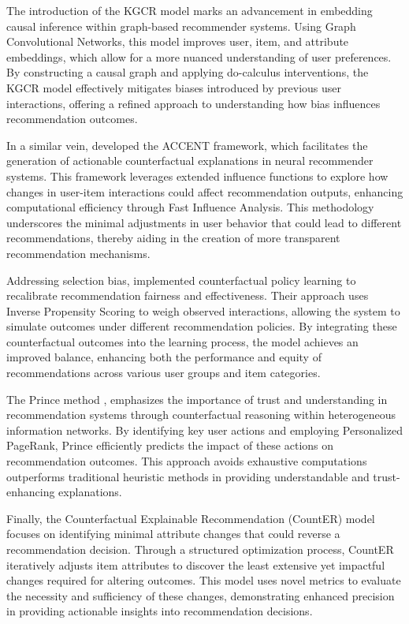 The introduction of the KGCR model \parencite{wei_causal_2023} marks an advancement in 
embedding causal inference within graph-based recommender systems.
Using Graph Convolutional Networks, this model improves user, item, and attribute
embeddings, which allow for a more nuanced understanding of user preferences. By
constructing a causal graph and applying do-calculus interventions, the KGCR
model effectively mitigates biases introduced by previous user interactions, offering
a refined approach to understanding how bias influences recommendation outcomes.

In a similar vein, \textcite{tran_counterfactual_2021} developed the ACCENT framework,
which facilitates the generation of actionable counterfactual explanations in
neural recommender systems. This framework leverages extended influence functions
to explore how changes in user-item interactions could affect recommendation outputs,
enhancing computational efficiency through Fast Influence Analysis.
This methodology underscores the minimal adjustments in user behavior that could
lead to different recommendations, thereby aiding in the creation of more
transparent recommendation mechanisms.

Addressing selection bias, \parencite{liu_practical_2022} implemented
counterfactual policy learning to recalibrate recommendation fairness and
effectiveness. Their approach uses Inverse Propensity Scoring to weigh observed
interactions, allowing the system to simulate outcomes under different
recommendation policies. By integrating these counterfactual outcomes into the learning
process, the model achieves an improved balance, enhancing both the performance and
equity of recommendations across various user groups and item categories.

The Prince method \parencite{ghazimatin_prince_2020}, emphasizes the importance of
trust and understanding in recommendation systems through counterfactual reasoning
within heterogeneous information networks. By identifying key user actions and
employing Personalized PageRank, Prince efficiently predicts the impact of these
actions on recommendation outcomes. This approach avoids exhaustive
computations outperforms traditional heuristic methods in providing
understandable and trust-enhancing explanations.


Finally, the Counterfactual Explainable Recommendation (CountER) model \parencite{tan_counterfactual_2021}
focuses on identifying minimal attribute changes that could reverse a
recommendation decision. Through a structured optimization process, CountER
iteratively adjusts item attributes to discover the least extensive yet
impactful changes required for altering outcomes. This model uses novel metrics
to evaluate the necessity and sufficiency of these changes, demonstrating
enhanced precision in providing actionable insights into recommendation
decisions.


